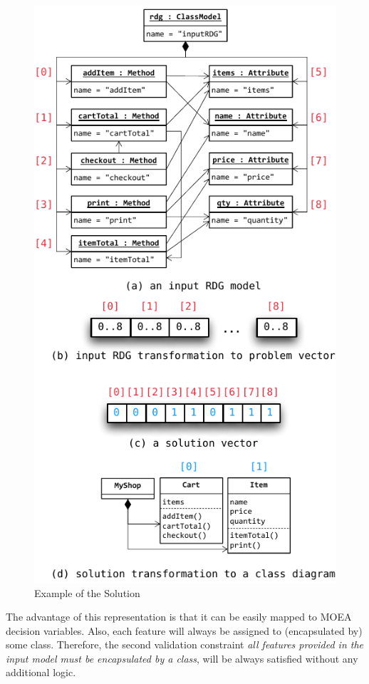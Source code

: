 \begin{figure}[h!tb]
  \centering
  \includegraphics[width=.9\columnwidth]{figures/solution-overview.pdf}
  \caption{Example of the Solution}
  \label{fig:SolutionOverview}
\end{figure}

The advantage of this representation is that it can be easily mapped to MOEA decision variables.
Also, each feature will always be assigned to (encapsulated by) some class.
Therefore, the second validation constraint \emph{all features provided in the input model must be encapsulated by a class}, will be always satisfied without any additional logic.

